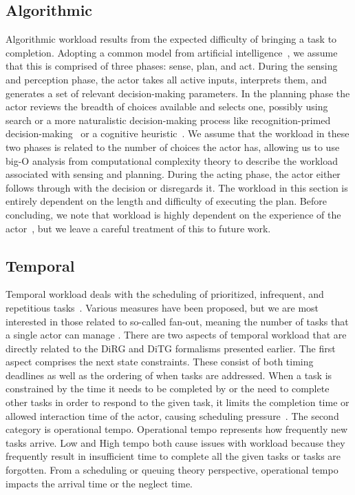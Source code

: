 \subsection{Algorithmic}
Algorithmic workload results from the expected difficulty of bringing a task to completion. Adopting a common model from artificial intelligence~\cite{Murphy00}, we assume that this is comprised of three phases: sense, plan, and act. During the sensing and perception phase, the actor takes all active inputs, interprets them, and generates a set of relevant decision-making parameters. In the planning phase the actor reviews the breadth of choices available and selects one, possibly using search or a more naturalistic decision-making process like recognition-primed decision-making~\cite{ZsambokKlein97} or a cognitive heuristic~\cite{GigerenzerTodd99}. We assume that the workload in these two phases is related to the number of choices the actor has, allowing us to use big-O analysis from computational complexity theory to describe the workload associated with sensing and planning. During the acting phase, the actor either follows through with the decision or disregards it. The workload in this section is entirely dependent on the length and difficulty of executing the plan. Before concluding, we note that workload is highly dependent on the experience of the actor~\cite{ZsambokKlein97}, but we leave a careful treatment of this to future work.


\subsection{Temporal}
Temporal workload deals with the scheduling of prioritized, infrequent, and repetitious tasks~\cite{DessoukyEtAl95,MorayEtAl91}. Various measures have been proposed, but we are most interested in those related to so-called fan-out, meaning the number of tasks that a single actor can manage \cite{Goodrich2010,OlsenWood2004,CrandallEtAl2005,Cummings2007}. There are two aspects of temporal workload that are directly related to the DiRG and DiTG formalisms presented earlier. The first aspect comprises the next state constraints. These consist of both timing deadlines as well as the ordering of when tasks are addressed. When a task is constrained by the time it needs to be completed by or the need to complete other tasks in order to respond to the given task, it limits the completion time or allowed interaction time of the actor, causing scheduling pressure~\cite{MauDolan2006}. The second category is operational tempo. Operational tempo represents how frequently new tasks arrive. Low and High tempo both cause issues with workload because they frequently result in insufficient time to complete all the given tasks or tasks are forgotten.  From a scheduling or queuing theory perspective, operational tempo impacts the arrival time or the neglect time.



